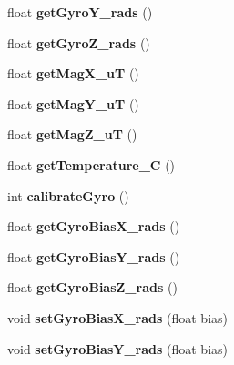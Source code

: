\begin{DoxyCompactItemize}
float {\bfseries get\+Gyro\+Y\+\_\+rads} ()
\item 
\mbox{\label{class_m_p_u9250_a07f8ccd1907f134d866105e3d5ec5a10}} 
float {\bfseries get\+Gyro\+Z\+\_\+rads} ()
\item 
\mbox{\label{class_m_p_u9250_a65c4f2aace22a783462b0ee9ef5cdd7b}} 
float {\bfseries get\+Mag\+X\+\_\+uT} ()
\item 
\mbox{\label{class_m_p_u9250_ac909d3078a23d24d44fb8852f9371c40}} 
float {\bfseries get\+Mag\+Y\+\_\+uT} ()
\item 
\mbox{\label{class_m_p_u9250_a95b19aa80f3ce812d6ccb87b57475389}} 
float {\bfseries get\+Mag\+Z\+\_\+uT} ()
\item 
\mbox{\label{class_m_p_u9250_a3b6cad3768c6153c56fcac4edd3fe792}} 
float {\bfseries get\+Temperature\+\_\+C} ()
\item 
\mbox{\label{class_m_p_u9250_a88596ddf9d0f52ca7b9181706d17217f}} 
int {\bfseries calibrate\+Gyro} ()
\item 
\mbox{\label{class_m_p_u9250_a551689391a2bfa5aa4af6f10b586ee76}} 
float {\bfseries get\+Gyro\+Bias\+X\+\_\+rads} ()
\item 
\mbox{\label{class_m_p_u9250_a42bd5c0267c0fa180dbc5c332db1ec66}} 
float {\bfseries get\+Gyro\+Bias\+Y\+\_\+rads} ()
\item 
\mbox{\label{class_m_p_u9250_aa48133a853a679469bfc91235c4a52cf}} 
float {\bfseries get\+Gyro\+Bias\+Z\+\_\+rads} ()
\item 
\mbox{\label{class_m_p_u9250_add18eb9ed44f047f11d75b2f1e44af4b}} 
void {\bfseries set\+Gyro\+Bias\+X\+\_\+rads} (float bias)
\item 
\mbox{\label{class_m_p_u9250_aa4adc28e4c00afdd04d9a0c754ef5cfd}} 
void {\bfseries set\+Gyro\+Bias\+Y\+\_\+rads} (float bias)
\item 
\mbox{\label{class_m_p_u9250_a66bf9a29debfc2de700f77373544c1a7}} 

\end{DoxyCompactItemize}
